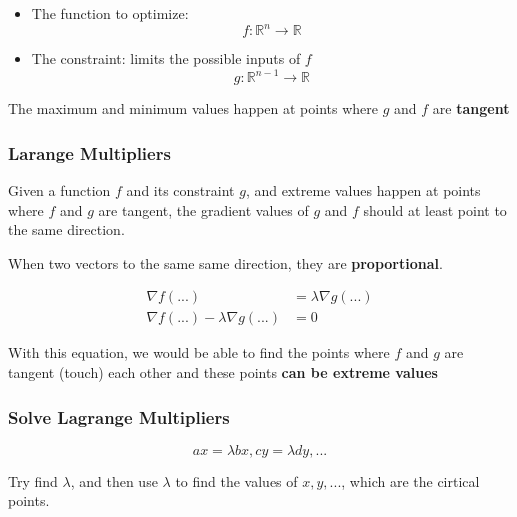     \begin{itemize}
      \item The function to optimize:
      \begin{displaymath}
        f: \mathbb{R}^{n} \to \mathbb{R}
      \end{displaymath}

      \item The constraint: limits the possible inputs of $ f $
      \begin{displaymath}
        g: \mathbb{R}^{n - 1} \to \mathbb{R}
      \end{displaymath}
    \end{itemize}

    The maximum and minimum values happen at points where $ g $ and $ f $
    are \textbf{tangent}

    \subsubsection{Larange Multipliers}

      Given a function $ f $ and its constraint $ g $, and extreme values
      happen at points where $ f $ and $ g $ are tangent, the gradient values
      of $ g $ and $ f $ should at least point to the same direction.

      When two vectors to the same same direction, they are
      \textbf{proportional}.

      \begin{align}
        \nabla f\left( ... \right) &= \lambda \nabla g\left( ... \right) \\
        \nabla f\left( ... \right) - \lambda \nabla g\left( ... \right) &= 0
      \end{align}

      With this equation, we would be able to find the points where $ f $
      and $ g $ are tangent (touch) each other and these points
      \textbf{can be extreme values}

    \subsubsection{Solve Lagrange Multipliers}

      \begin{displaymath}
        ax = \lambda bx, cy = \lambda dy, ...
      \end{displaymath}

      Try find $ \lambda $, and then use $ \lambda $ to find the values
      of $ x, y, ... $, which are the cirtical points.
